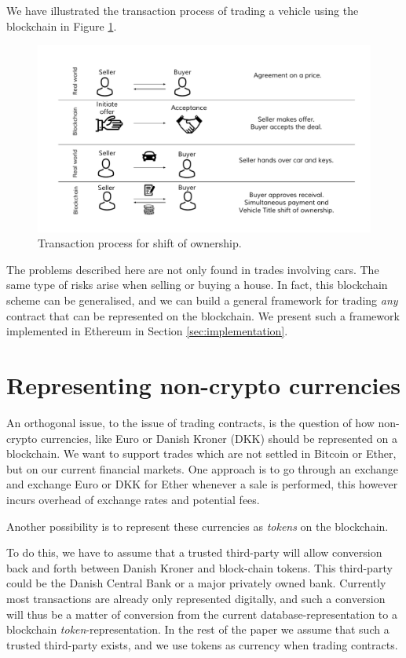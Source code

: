 \documentclass[oneside,a4paper,10pts,article]{memoir}
\begin{document}
We have illustrated the transaction process of trading a vehicle using
the blockchain in Figure \ref{fig:shift-of-ownership}.

\begin{figure}
  \centering
  \includegraphics[width=\textwidth]{shift-of-ownership.pdf}
  \caption{Transaction process for shift of ownership.}
  \label{fig:shift-of-ownership}
\end{figure}

The problems described here are not only found in trades involving
cars. The same type of risks arise when selling or buying a house. In
fact, this blockchain scheme can be generalised, and we can build a
general framework for trading \textit{any} contract that can be
represented on the blockchain. We present such a framework implemented
in Ethereum in Section \ref{sec:implementation}.

\chapter{Representing non-crypto currencies}
\label{sec:currency}
An orthogonal issue, to the issue of trading contracts, is the
question of how non-crypto currencies, like Euro or Danish Kroner
(DKK) should be represented on a blockchain. We want to support trades
which are not settled in Bitcoin or Ether, but on our current
financial markets. One approach is to go through an exchange and
exchange Euro or DKK for Ether whenever a sale is performed, this
however incurs overhead of exchange rates and potential fees.

Another possibility is to represent these currencies as
\textit{tokens} on the blockchain. 

To do this, we have to assume that a trusted third-party will allow
conversion back and forth between Danish Kroner and block-chain
tokens. This third-party could be the Danish Central Bank or a major
privately owned bank. Currently most transactions are already only
represented digitally, and such a conversion will thus be a matter of
conversion from the current database-representation to a blockchain
\emph{token}-representation. In the rest of the paper we assume that
such a trusted third-party exists, and we use tokens as currency when
trading contracts.
\end{document}
